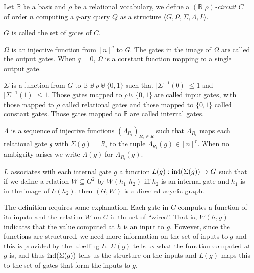 \documentclass[../main/thesis.tex]{subfiles}
\begin{document}
\begin{definition}
  Let $\mathbb{B}$ be a basis and $\rho$ be a relational vocabulary, we define a
  \emph{$(\mathbb{B}, \rho)$-circuit} $C$ of order $n$ computing a $q$-ary query
  $Q$ as a structure $\langle G, \Omega, \Sigma, \Lambda, L \rangle$.
  \begin{myitemize}
    \setlength\itemsep{0mm}
  \item $G$ is called the set of gates of $C$.
  \item $\Omega$ is an injective function from $[n]^q$ to $G$. The gates in the
    image of $\Omega$ are called the output gates. When $q = 0$, $\Omega$ is a
    constant function mapping to a single output gate.
  \item $\Sigma$ is a function from $G$ to $\mathbb{B} \uplus \rho \uplus
    \{0,1\} $ such that $\vert \Sigma^{-1} (0) \vert \leq 1$ and $\vert
    \Sigma^{-1} (1) \vert \leq 1$. Those gates mapped to $\rho \uplus \{0,1\}$
    are called input gates, with those mapped to $\rho$ called relational gates
    and those mapped to $\{0,1\}$ called constant gates. Those gates mapped to
    $\mathbb{B}$ are called internal gates.
  \item $\Lambda$ is a sequence of injective functions $(\Lambda_{R_i})_{R_i \in
      R}$ such that $\Lambda_{R_i}$ maps each relational gate $g$ with $\Sigma
    (g) = R_i$ to the tuple $\Lambda_{R_i} (g) \in [n]^{r}$. When no ambiguity
    arises we write $\Lambda (g)$ for $\Lambda_{R_i} (g)$.
  \item $L$ associates with each internal gate $g$ a function $L(g):
    \text{\upshape ind}(\Sigma(g)) \rightarrow G$ such that if we define a relation $W
    \subseteq G^{2}$ by $W(h_1,h_2)$ iff $h_2$ is an internal gate and $h_1$ is
    in the image of $L(h_2)$, then $(G, W)$ is a directed acyclic graph.
  \end{myitemize}
\end{definition}

The definition requires some explanation. Each gate in $G$ computes a function
of its inputs and the relation $W$ on $G$ is the set of ``wires''. That is,
$W(h,g)$ indicates that the value computed at $h$ is an input to $g$. However,
since the functions are structured, we need more information on the set of
inputs to $g$ and this is provided by the labelling $L$. $\Sigma(g)$ tells us
what the function computed at $g$ is, and thus $\text{\upshape ind}(\Sigma(g))$ tells us the
structure on the inputs and $L(g)$ maps this to the set of gates that form the
inputs to $g$.
\end{document}

